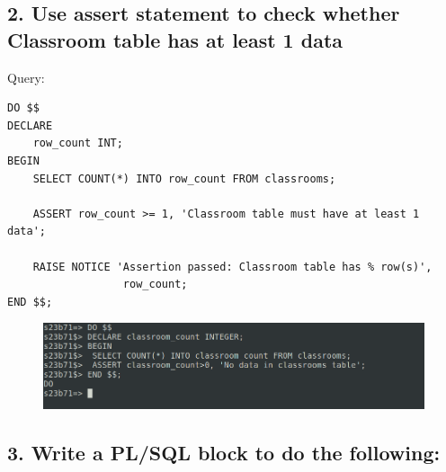 \documentclass{article}
\begin{document}
\subsection*{2. Use assert statement to check whether Classroom table has at least 1 data}
Query:
\begin{Verbatim}[frame=single,framerule=1pt,fontfamily=courier,fontsize=\small]
DO $$
DECLARE
    row_count INT;
BEGIN
    SELECT COUNT(*) INTO row_count FROM classrooms;
    
    ASSERT row_count >= 1, 'Classroom table must have at least 1 data';
    
    RAISE NOTICE 'Assertion passed: Classroom table has % row(s)', 
                  row_count;
END $$;
\end{Verbatim}
\begin{figure}[H]
    \centering
    \includegraphics[width=\textwidth]{cycle5/5_2_1.png}
\end{figure}


\subsection*{3. Write a PL/SQL block to do the following:}
\end{document}
